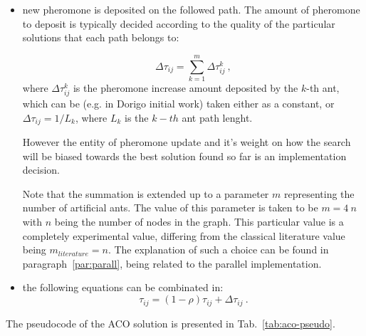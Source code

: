 \documentclass[10pt]{article}
\begin{document}
\begin{itemize}
\begin{itemize}
\item new pheromone is deposited on the followed path.  The  amount  of  pheromone  to  deposit  is  typically decided  according  to  the  quality  of  the particular  solutions  that  each  path  belongs  to:

\begin{equation}
\Delta \tau_{ij}= \sum_{k=1}^{m} \Delta \tau_{ij}^k ~,
\label{eq:delta-tau}
\end{equation} 
where $\Delta \tau_{ij}^k$ is the pheromone increase amount deposited by the $k$-th ant, which can be (e.g. in Dorigo initial work) taken either as a constant, or $\Delta \tau_{ij}= 1/L_k$, where $L_k$ is the $k-th$ ant path lenght.

However  the entity of  pheromone  update and  it's weight on how the search will be biased towards the best solution found so far is an implementation decision.

Note that the summation is extended up to a parameter $m$ representing the number of artificial ants. The value of this parameter is taken to be $m= 4~n$ with $n$ being the number of nodes in the graph. This particular value is a completely experimental value, differing from the classical literature value being $m_{literature}=n$.
The explanation of such a choice can be found in paragraph~\ref{par:parall}, being related to the parallel implementation.
\item the following equations can be combinated in:
\begin{equation}
\tau_{ij}= (1-\rho) \tau_{ij} + \Delta \tau_{ij} ~.
\label{eq:aco-update}
\end{equation}
\end{itemize}
\end{itemize}

The pseudocode of the ACO solution is presented in Tab.~\ref{tab:aco-pseudo}.
\end{document}
